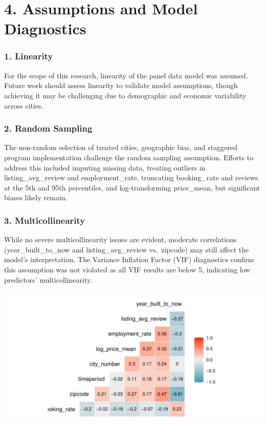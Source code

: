 \documentclass[
  12pt,
]{article}
\begin{document}
\section{4. Assumptions and Model
Diagnostics}\label{assumptions-and-model-diagnostics}

\subsubsection{1. Linearity}\label{linearity}

For the scope of this research, linearity of the panel data model was
assumed. Future work should assess linearity to validate model
assumptions, though achieving it may be challenging due to demographic
and economic variability across cities.

\subsubsection{2. Random Sampling}\label{random-sampling}

The non-random selection of treated cities, geographic bias, and
staggered program implementation challenge the random sampling
assumption. Efforts to address this included imputing missing data,
treating outliers in listing\_avg\_review and employment\_rate,
truncating booking\_rate and reviews at the 5th and 95th percentiles,
and log-transforming price\_mean, but significant biases likely remain.

\subsubsection{3. Multicollinearity}\label{multicollinearity}

While no severe multicollinearity issues are evident, moderate
correlations (year\_built\_to\_now and listing\_avg\_review vs.~zipcode)
may still affect the model's interpretation. The Variance Inflation
Factor (VIF) diagnostics confirm this assumption was not violated as all
VIF results are below 5, indicating low predictors' multicollinearity.

\includegraphics{assignment2_final_2_files/figure-latex/unnamed-chunk-17-1.pdf}
\end{document}
